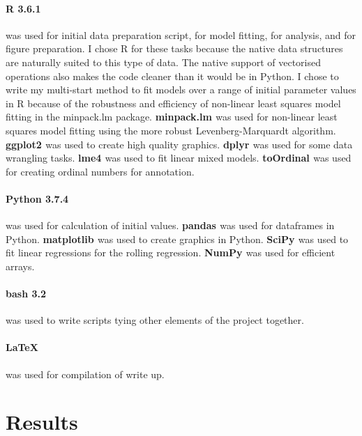 \documentclass[11pt, a4paper]{article}
\begin{document}
\begin{linenumbers}
\paragraph{R 3.6.1 \cite{R}} was used for initial data preparation script, for model fitting, for analysis, and for figure preparation. I chose R for these tasks because the native data structures are naturally suited to this type of data. The native support of vectorised operations also makes the code cleaner than it would be in Python. I chose to write my multi-start method to fit models over a range of initial parameter values in R because of the robustness and efficiency of non-linear least squares model fitting in the minpack.lm package. \textbf{minpack.lm \cite{minpack}} was used for non-linear least squares model fitting using the more robust Levenberg-Marquardt algorithm. \textbf{ggplot2 \cite{gg}} was used to create high quality graphics. \textbf{dplyr \cite{dplyr}} was used for some data wrangling tasks. \textbf{lme4 \cite{lme4}} was used to fit linear mixed models. \textbf{toOrdinal \cite{tO}} was used for creating ordinal numbers for annotation.

\paragraph{Python 3.7.4 \cite{python}} was used for calculation of initial values. \textbf{pandas \cite{pd}} was used for dataframes in Python. \textbf{matplotlib \cite{plt}} was used to create graphics in Python. \textbf{SciPy \cite{numpy}} was used to fit linear regressions for the rolling regression. \textbf{NumPy \cite{numpy}} was used for efficient arrays.

\paragraph{bash 3.2} was used to write scripts tying other elements of the project together.

\paragraph{\LaTeX } was used for compilation of write up.
\section{Results}


\end{linenumbers}
\end{document}
